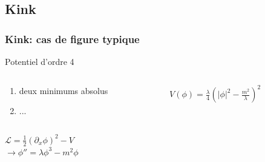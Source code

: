 \documentclass[handout]{beamer}
\begin{document}
\subsection{Kink}
\begin{frame}
\frametitle{Kink: cas de figure typique}
\begin{block}{Potentiel d'ordre 4}

 \begin{columns}[T]
    \begin{column}[T]{.5\linewidth}
    \begin{enumerate}
    \item deux minimums absolus
    \item ...
	\end{enumerate}      
    \end{column}
    \begin{column}[T]{.5\linewidth}
    $V(\phi) = \frac{\lambda}{4}(|\phi|^2 -\frac{m^2}{\lambda})^2$
    \begin{figure}
    \end{figure}
    \end{column}
  \end{columns}

\end{block}
$\mathcal{L} = \frac{1}{2}(\partial_x \phi)^2 - V $ \\
$\rightarrow \phi'' = \lambda \phi^3 - m^2 \phi$ \\
\end{frame}
\end{document}

